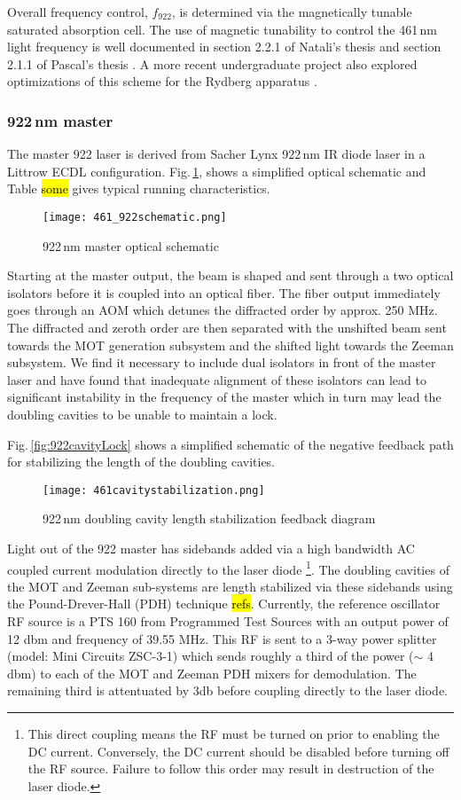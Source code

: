 Overall frequency control, $f_{922}$, is determined via the magnetically tunable saturated absorption cell.
The use of magnetic tunability to control the 461\,nm light frequency is well documented in section 2.2.1 of Natali's thesis \cite{MartinezdeEscolar2010} and section 2.1.1 of Pascal's thesis \cite{Mickelson2010b}.
A more recent undergraduate project also explored optimizations of this scheme for the Rydberg apparatus \cite{MichaelViray2014}.

\subsubsection{922\,nm master}
The master 922 laser is derived from Sacher Lynx 922\,nm IR diode laser in a Littrow ECDL configuration.
Fig.\,\ref{fig:922optical}, shows a simplified optical schematic and Table \hl{some} gives typical running characteristics.
	\begin{figure}
		\centerline{
		\texttt{[image: 461\_922schematic.png]}}
		\caption{922\,nm master optical schematic}
		\label{fig:922optical}
	\end{figure} 
	
Starting at the master output, the beam is shaped and sent through a two optical isolators before it is coupled into an optical fiber.
The fiber output immediately goes through an AOM which detunes the diffracted order by approx. 250 MHz.
The diffracted and zeroth order are then separated with the unshifted beam sent towards the MOT generation subsystem and the shifted light towards the Zeeman subsystem.
We find it necessary to include dual isolators in front of the master laser and have found that inadequate alignment of these isolators can lead to significant instability in the frequency of the master which in turn may lead the doubling cavities to be unable to maintain a lock.

Fig.\,\ref{fig:922cavityLock} shows a simplified schematic of the negative feedback path for stabilizing the length of the doubling cavities.
	\begin{figure}
		\centerline{
		\texttt{[image: 461cavitystabilization.png]}}
		\caption{922\,nm doubling cavity length stabilization feedback diagram}
		\label{fig:461cavityLock}
	\end{figure}
Light out of the 922 master has sidebands added via a high bandwidth AC coupled current modulation directly to the laser diode 
\footnote{This direct coupling means the RF must be turned on prior to enabling the DC current. 
Conversely, the DC current should be disabled before turning off the RF source. 
Failure to follow this order may result in destruction of the laser diode.}.
The doubling cavities of the MOT and Zeeman sub-systems are length stabilized via these sidebands using the Pound-Drever-Hall (PDH) technique \hl{refs}.
Currently, the reference oscillator RF source is a PTS 160 from Programmed Test Sources with an output power of 12 dbm and frequency of 39.55 MHz.
This RF is sent to a 3-way power splitter (model: Mini Circuits ZSC-3-1) which sends roughly a third of the power ($\sim$ 4 dbm) to each of the MOT and Zeeman PDH mixers for demodulation. 
The remaining third is attentuated by 3db before coupling directly to the laser diode.

